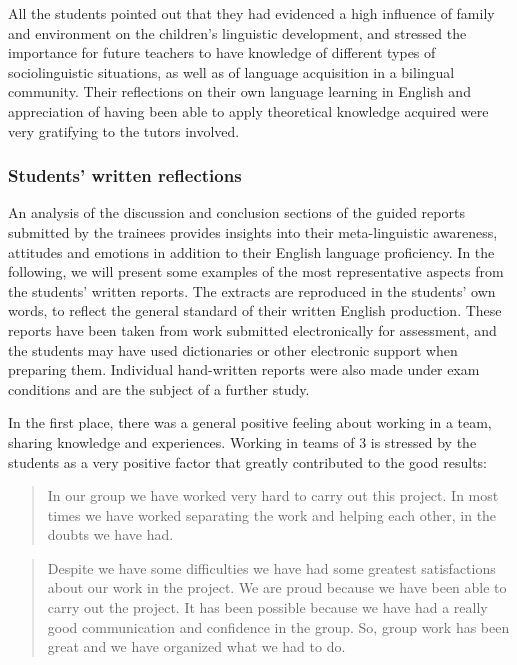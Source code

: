 \documentclass[output=paper]{../langscibook}
\begin{document}
All the students pointed out that they had evidenced a high influence of family and environment on the children’s linguistic development, and stressed the importance for future teachers to have knowledge of different types of sociolinguistic situations, as well as of language acquisition in a bilingual community. Their reflections on their own language learning in English and appreciation of having been able to apply theoretical knowledge acquired were very gratifying to the tutors involved.  


\subsubsection{Students’ written reflections}


An analysis of the discussion and conclusion sections of the guided reports submitted by the trainees provides insights into their meta-linguistic awareness, attitudes and emotions in addition to their English language proficiency. In the following, we will present some examples of the most representative aspects from the students’ written reports. The extracts are reproduced in the students' own words, to reflect the general standard of their written English production. These reports have been taken from work submitted electronically for assessment, and the students may have used dictionaries or other electronic support when preparing them. Individual hand-written reports were also made under exam conditions and are the subject of a further study.




In the first place, there was a general positive feeling about working in a team, sharing knowledge and experiences. Working in teams of 3 is stressed by the students as a very positive factor that greatly contributed to the good results:

\begin{quote}
 In our group we have worked very hard to carry out this project. In most times we have worked separating the work and helping each other, in the doubts we have had.
\end{quote}

\begin{quote}
Despite we have some difficulties we have had some greatest satisfactions about our work in the project. We are proud because we have been able to carry out the project. It has been possible because we have had a really good communication and confidence in the group. So, group work has been great and we have organized what we had to do. 
\end{quote}
\end{document}
